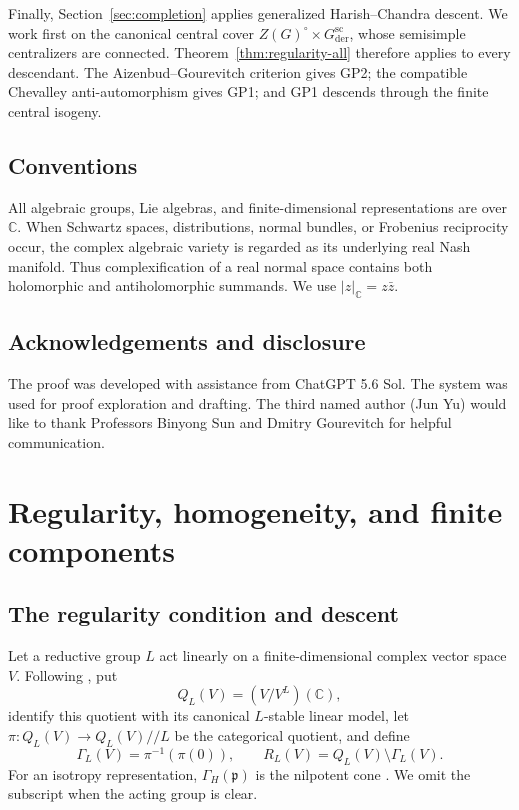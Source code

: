 \documentclass[10pt,a4paper]{amsart}
\numberwithin{equation}{section}
\newcommand{\C}{\mathbb C}
\newcommand{\fp}{\mathfrak p}
\newcommand{\sslash}{/\!\!/}
\begin{document}
Finally, Section~\ref{sec:completion} applies generalized Harish--Chandra
descent.  We work first on the canonical central cover
$Z(G)^\circ\times G_{\mathrm{der}}^{\mathrm{sc}}$, whose semisimple
centralizers are connected.  Theorem~\ref{thm:regularity-all} therefore applies
to every descendant.  The Aizenbud--Gourevitch criterion gives GP2; the
compatible Chevalley anti-automorphism gives GP1; and GP1 descends through the
finite central isogeny.

\subsection{Conventions}

All algebraic groups, Lie algebras, and finite-dimensional representations are
over $\C$.  When Schwartz spaces, distributions, normal bundles, or Frobenius
reciprocity occur, the complex algebraic variety is regarded as its underlying
real Nash manifold.  Thus complexification of a real normal space contains
both holomorphic and antiholomorphic summands.  We use
$|z|_{\C}=z\bar z$.

\subsection{Acknowledgements and disclosure} The proof was developed with assistance from ChatGPT 5.6 Sol. 
The system was used for proof exploration and drafting. The third named author (Jun Yu) would like to thank 
Professors Binyong Sun and Dmitry Gourevitch for helpful communication.  


\section{Regularity, homogeneity, and finite components}\label{sec:framework}

\subsection{The regularity condition and descent}

Let a reductive group $L$ act linearly on a finite-dimensional complex vector
space $V$.  Following \cite[Notation~2.3.10]{AG09}, put
\[
  Q_L(V)=(V/V^L)(\C),
\]
identify this quotient with its canonical $L$-stable linear model, let
$\pi:Q_L(V)\to Q_L(V)\sslash L$ be the categorical quotient, and define
\[
  \Gamma_L(V)=\pi^{-1}(\pi(0)),\qquad
  R_L(V)=Q_L(V)\setminus\Gamma_L(V).
\]
For an isotropy representation, $\Gamma_H(\fp)$ is the nilpotent cone
\cite{KR,AG09}.  We omit the subscript when the acting group is clear.
\end{document}
